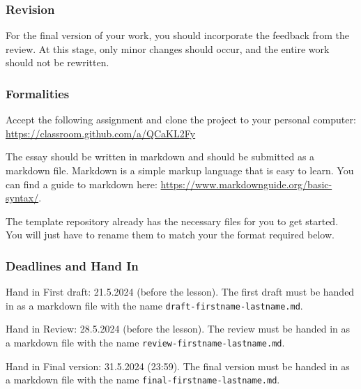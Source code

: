 \documentclass[12pt,a4paper]{report}
\begin{document}


\subsubsection*{Revision}
For the final version of your work, you should incorporate the feedback from the review. At this stage, only minor changes should occur, and the entire work should not be rewritten.

\subsubsection*{Formalities}
Accept the following assignment and clone the project to your personal computer:
\url{https://classroom.github.com/a/QCaKL2Fy}

The essay should be written in markdown and should be submitted as a markdown file. Markdown is a simple markup language that is easy to learn. You can find a guide to markdown here: \url{https://www.markdownguide.org/basic-syntax/}.

The template repository already has the necessary files for you to get started. You will just have to rename them to match your the format required below.


\subsubsection*{Deadlines and Hand In}

Hand in First draft: 21.5.2024 (before the lesson).
The first draft must be handed in as a markdown file with the name \verb|draft-firstname-lastname.md|.

Hand in Review: 28.5.2024 (before the lesson).
The review must be handed in as a markdown file with the name \verb|review-firstname-lastname.md|.

Hand in Final version: 31.5.2024 (23:59).
The final version must be handed in as a markdown file with the name \verb|final-firstname-lastname.md|.
\end{document}
